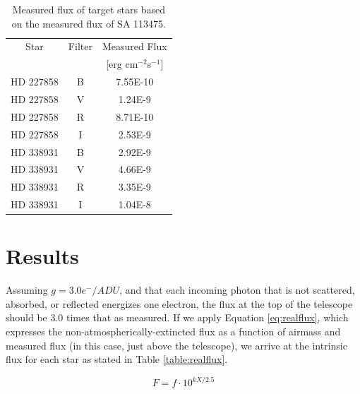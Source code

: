 \documentclass{article}
\begin{document}
\begin{table}
\begin{center}
\begin{tabular}{c | c | c}
Star& Filter & Measured Flux\\
& &[erg cm$^{-2}$s$^{-1}$]\\
\hline
HD 227858 & B & 7.55E-10\\
HD 227858 & V & 1.24E-9\\
HD 227858 & R & 8.71E-10\\
HD 227858 & I & 2.53E-9\\
HD 338931 &B & 2.92E-9\\
HD 338931 &V & 4.66E-9\\
HD 338931 &R & 3.35E-9\\
HD 338931 & I & 1.04E-8\\
\end{tabular}
\caption{Measured flux of target stars based on the measured flux of SA 113475.}
\label{table:fluxes}
\end{center}
\end{table}


\section{Results}
Assuming $g=3.0e^-/ADU$, and that each incoming photon that is not scattered, absorbed, or reflected energizes one electron,
the flux at the top of the telescope should be 3.0 times that as measured. If we apply Equation \ref{eq:realflux}, which expresses the
non-atmospherically-extincted flux as a function of airmass and measured flux (in this case, just above the telescope), we arrive at the
intrinsic flux for each star as stated in Table \ref{table:realflux}.

\begin{equation}
\label{eq:realflux}
F=f\cdot10^{kX/2.5}
\end{equation}
\end{document}
